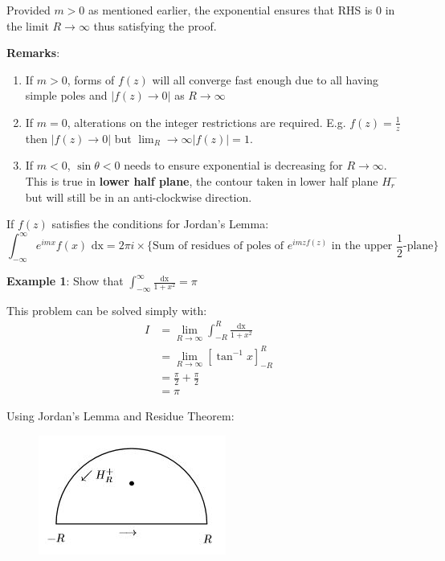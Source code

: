 \documentclass[10pt,a4paper]{article}
\begin{document}
Provided $m>0$ as mentioned earlier, the exponential ensures that RHS is 0 in the limit
$R\rightarrow \infty$ thus satisfying the proof.

\textbf{Remarks}: 
\begin{enumerate}
    \item If $m>0$, forms of $f(z)$ will all converge fast enough due to all having simple poles and
    $|f(z)\rightarrow 0|$ as $R \rightarrow \infty$
    \item If $m=0$, alterations on the integer restrictions are required. E.g. $f(z)=\frac{1}{z}$
    then $|f(z)\rightarrow 0|$ but $\lim_R\rightarrow \infty |f(z)|=1$.
    \item If $m<0$, $\sin \theta < 0$ needs to ensure exponential is decreasing for $R\rightarrow \infty$.
    This is true in \textbf{lower half plane}, the contour taken in lower half plane $H_r^-$ but
    will still be in an anti-clockwise direction. 
\end{enumerate}

If $f(z)$ satisfies the conditions for Jordan's Lemma:
\small
$$
\int_{-\infty}^{\infty} e^{imx}f(x)\text{ dx} = 2\pi i \times \{\text{Sum of residues of poles of }e^{imzf(z)} \text{ in the upper }\frac{1}{2}\text{-plane} \}
$$


\textbf{Example 1}: Show that $\int_{-\infty}^{\infty} \frac{\text{dx}}{1+x^2} = \pi$ \par 

This problem can be solved simply with:
\begin{equation*} 
    \begin{aligned}
        I &= \lim_{R\rightarrow \infty}\int_{-R}^R \frac{\text{dx}}{1+x^2} \\
        &= \lim_{R\rightarrow \infty} [\tan^{-1}x]_{-R}^R \\
        &= \frac{\pi}{2}+\frac{\pi}{2} \\
        &= \pi
    \end{aligned}
\end{equation*}

Using Jordan's Lemma and Residue Theorem: 
\begin{figure} [h!]
    \centering
    \includegraphics[scale=0.7]{Jordan_q.JPG}
    
\end{figure}
\end{document}
